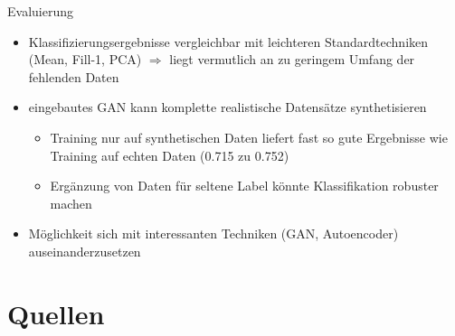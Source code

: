 \documentclass[10pt,%
	wide,%
	xcolor={x11names},%
	hyperref={colorlinks},%
	pantone312,%
	handout,%
	]{beamer}
\begin{document}
\begin{frame}[t]{Evaluierung}
	\begin{itemize}
		\item Klassifizierungsergebnisse vergleichbar mit leichteren Standardtechniken (Mean, Fill-1, PCA) $\Rightarrow$ liegt vermutlich an zu geringem Umfang der fehlenden Daten
		\item eingebautes GAN kann komplette realistische Datensätze synthetisieren
		\begin{itemize}
			\item Training nur auf synthetischen Daten liefert fast so gute Ergebnisse wie Training auf echten Daten (0.715 zu 0.752)
			\item Ergänzung von Daten für seltene Label könnte Klassifikation robuster machen
		\end{itemize}
		\item Möglichkeit sich mit interessanten Techniken (GAN, Autoencoder) auseinanderzusetzen
	\end{itemize}
\end{frame}

\section*{Quellen}
\begin{frame}[allowframebreaks,t]{\secname}
\printbibliography
\end{frame}
\end{document}
